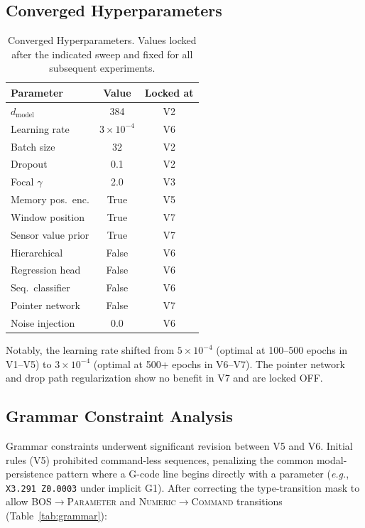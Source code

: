 \documentclass[sensors,article,submit,moreauthors,pdftex]{Definitions/mdpi}
\newcommand{\eg}{\textit{e.g.}}
\begin{document}
\subsection{Converged Hyperparameters}
\label{sec:appendix_hyperparams}

\begin{table}[htbp]
\centering
\caption{Converged Hyperparameters. Values locked after the indicated sweep and fixed for all subsequent experiments.}
\label{tab:converged}
\small
\begin{tabular}{@{}lcc@{}}
\toprule
\textbf{Parameter} & \textbf{Value} & \textbf{Locked at} \\
\midrule
$d_\text{model}$ & 384 & V2 \\
Learning rate & $3 \times 10^{-4}$ & V6 \\
Batch size & 32 & V2 \\
Dropout & 0.1 & V2 \\
Focal $\gamma$ & 2.0 & V3 \\
Memory pos.\ enc. & True & V5 \\
Window position & True & V7 \\
Sensor value prior & True & V7 \\
Hierarchical & False & V6 \\
Regression head & False & V6 \\
Seq.\ classifier & False & V6 \\
Pointer network & False & V7 \\
Noise injection & 0.0 & V6 \\
\bottomrule
\end{tabular}
\normalsize
\end{table}

Notably, the learning rate shifted from $5 \times 10^{-4}$ (optimal at 100--500 epochs in V1--V5) to $3 \times 10^{-4}$ (optimal at 500+ epochs in V6--V7). The pointer network and drop path regularization show no benefit in V7 and are locked OFF.

\subsection{Grammar Constraint Analysis}
\label{sec:appendix_grammar}

Grammar constraints underwent significant revision between V5 and V6. Initial rules (V5) prohibited command-less sequences, penalizing the common modal-persistence pattern where a G-code line begins directly with a parameter (\eg, \texttt{X3.291 Z0.0003} under implicit G1). After correcting the type-transition mask to allow \textsc{BOS}$\to$\textsc{Parameter} and \textsc{Numeric}$\to$\textsc{Command} transitions (Table~\ref{tab:grammar}):
\end{document}
